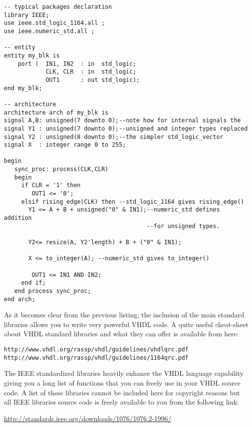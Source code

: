 \noindent
\begin{minipage}{0.99\linewidth}
\begin{lstlisting}[label=good_lib_ex, caption=Example of operators and types available with some IEEE packages.]
-- typical packages declaration
library IEEE;
use ieee.std_logic_1164.all ;
use ieee.numeric_std.all ;

-- entity
entity my_blk is
    port (  IN1, IN2  : in  std_logic;
            CLK, CLR  : in  std_logic;
            OUT1      : out std_logic);
end my_blk;

-- architecture
architecture arch of my_blk is
signal A,B: unsigned(7 downto 0);--note how for internal signals the
signal Y1 : unsigned(7 downto 0);--unsigned and integer types replaced
signal Y2 : unsigned(8 downto 0);--the simpler std_logic_vector
signal X  : integer range 0 to 255;

begin
   sync_proc: process(CLK,CLR)
   begin
     if CLR = '1' then
        OUT1 <= '0';
     elsif rising_edge(CLK) then --std_logic_1164 gives rising_edge()
       Y1 <= A + B + unsigned("0" & IN1);--numeric_std defines addition
                                         --for unsigned types.

       Y2<= resize(A, Y2'length) + B + ("0" & IN1);

       X <= to_integer(A); --numeric_std gives to_integer()

        OUT1 <= IN1 AND IN2;
     end if;
   end process sync_proc;
end arch;
\end{lstlisting}
\end{minipage}

As it becomes clear from the previous listing, the inclusion of the main standard libraries allows you to write very powerful VHDL code. A quite useful cheat-sheet about VHDL standard libraries and what they can offer is available from here:

\noindent
\begin{verbatim}
http://www.vhdl.org/rassp/vhdl/guidelines/vhdlqrc.pdf
http://www.vhdl.org/rassp/vhdl/guidelines/1164qrc.pdf
\end{verbatim}

The IEEE standardized libraries heavily enhance the VHDL language capability giving you a long list of functions that you can freely use in your VHDL source code. A list of these libraries cannot be included here for copyright reasons but all IEEE libraries source code is freely available to you from the following link:

\noindent
\url{http://standards.ieee.org/downloads/1076/1076.2-1996/}

